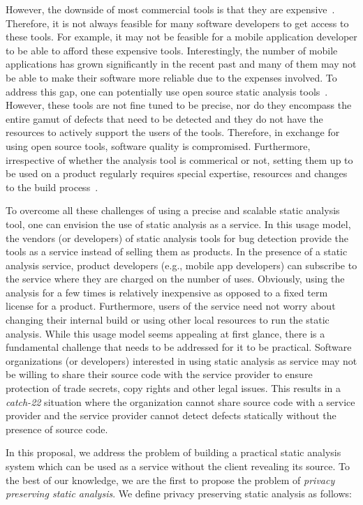 \documentclass[conference]{IEEEtran}
\begin{document}
However, the downside of most commercial tools is that they are expensive~\cite{coverity,klocwork}. Therefore, it is not always 
feasible for many software developers to get access to these tools. For example, it may not be 
feasible for a mobile application developer to be able to afford these expensive tools. Interestingly, the
number of mobile applications has grown significantly in the recent past and many of them may 
not be able to make their software more reliable due to the expenses involved. 
To address this gap, one can potentially use open source static analysis tools~\cite{findbugs,saturn}. 
However, these tools are not fine tuned to be precise, nor do they encompass the entire gamut of defects 
that need to be detected and they do not have the resources to actively support the users of the tools. 
Therefore, in exchange for using open source tools, software quality is compromised.
Furthermore, irrespective of whether the analysis tool is commerical or not, 
setting them up to be used on a product regularly requires special expertise, resources 
and changes to the build process~\cite{fse13,billionlinesofcode}. 
 
To overcome all these challenges of using a precise and scalable static analysis tool, 
one can envision the use of static analysis as a service. In this usage model, 
the vendors (or developers) of static analysis tools for bug detection provide the tools 
as a service instead of selling them as products. In the presence of a static analysis 
service, product developers (e.g., mobile app developers) can subscribe to the service 
where they are charged on the number of uses. Obviously, using the analysis for a few times 
is relatively inexpensive as opposed to a fixed term license for a product. Furthermore, 
users of the service need not worry about changing their internal build or using other local resources 
to run the static analysis. While this usage model seems appealing at first glance, 
there is a fundamental challenge that needs to be addressed for it to be practical. 
Software organizations (or developers) interested in using static analysis as service 
may not be willing to share their source code with the service provider to ensure 
protection of trade secrets, copy rights and other legal issues. This results in a 
{\em catch-22} situation where the organization cannot share source code with 
a service provider and the service provider cannot detect defects statically without 
the presence of source code. 

In this proposal, we address the problem of building a practical static analysis system 
which can be used as a service without the client revealing its source. To the best 
of our knowledge, we are the first to propose the problem of {\em privacy preserving 
static analysis}. We define privacy preserving static analysis as follows:  
\end{document}
